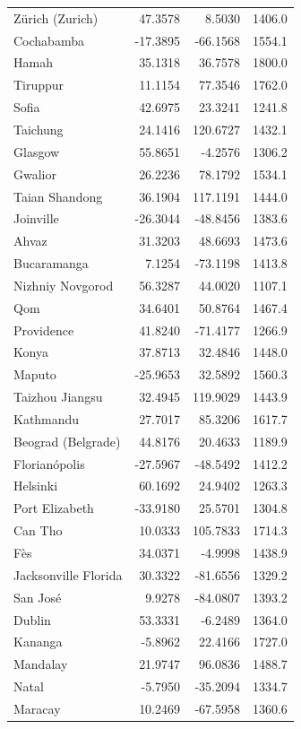 \begin{longtable}{lrrc}
Zürich (Zurich) & 47.3578 & 8.5030 & 1406.0 \\
Cochabamba & -17.3895 & -66.1568 & 1554.1 \\
Hamah & 35.1318 & 36.7578 & 1800.0 \\
Tiruppur & 11.1154 & 77.3546 & 1762.0 \\
Sofia & 42.6975 & 23.3241 & 1241.8 \\
Taichung & 24.1416 & 120.6727 & 1432.1 \\
Glasgow & 55.8651 & -4.2576 & 1306.2 \\
Gwalior & 26.2236 & 78.1792 & 1534.1 \\
Taian  Shandong & 36.1904 & 117.1191 & 1444.0 \\
Joinville & -26.3044 & -48.8456 & 1383.6 \\
Ahvaz & 31.3203 & 48.6693 & 1473.6 \\
Bucaramanga & 7.1254 & -73.1198 & 1413.8 \\
Nizhniy Novgorod & 56.3287 & 44.0020 & 1107.1 \\
Qom & 34.6401 & 50.8764 & 1467.4 \\
Providence & 41.8240 & -71.4177 & 1266.9 \\
Konya & 37.8713 & 32.4846 & 1448.0 \\
Maputo & -25.9653 & 32.5892 & 1560.3 \\
Taizhou  Jiangsu & 32.4945 & 119.9029 & 1443.9 \\
Kathmandu & 27.7017 & 85.3206 & 1617.7 \\
Beograd (Belgrade) & 44.8176 & 20.4633 & 1189.9 \\
Florianópolis & -27.5967 & -48.5492 & 1412.2 \\
Helsinki & 60.1692 & 24.9402 & 1263.3 \\
Port Elizabeth & -33.9180 & 25.5701 & 1304.8 \\
Can Tho & 10.0333 & 105.7833 & 1714.3 \\
Fès & 34.0371 & -4.9998 & 1438.9 \\
Jacksonville  Florida & 30.3322 & -81.6556 & 1329.2 \\
San José & 9.9278 & -84.0807 & 1393.2 \\
Dublin & 53.3331 & -6.2489 & 1364.0 \\
Kananga & -5.8962 & 22.4166 & 1727.0 \\
Mandalay & 21.9747 & 96.0836 & 1488.7 \\
Natal & -5.7950 & -35.2094 & 1334.7 \\
Maracay & 10.2469 & -67.5958 & 1360.6 \\

\end{longtable}
